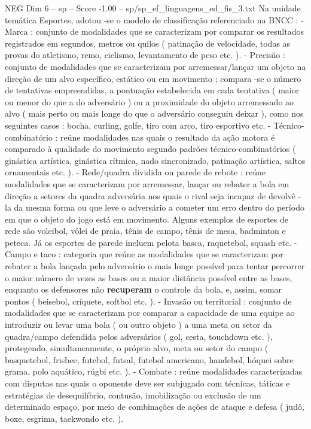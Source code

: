 \begin{textsample}{NEG Dim 6 – sp – Score -1.00 – sp/sp\_ef\_linguagens\_ed\_fis\_3.txt}  \label{ex:f6_neg_203}
Na unidade temática Esportes, adotou -se o modelo de classificação referenciado na BNCC : - Marca : conjunto de modalidades que se caracterizam por comparar os resultados registrados em segundos, metros ou quilos ( patinação de velocidade, todas as provas do atletismo, remo, ciclismo, levantamento de peso etc. ). - Precisão : conjunto de modalidades que se caracterizam por arremessar/lançar um objeto na direção de um alvo específico, estático ou em movimento ; compara -se o número de tentativas empreendidas, a pontuação estabelecida em cada tentativa ( maior ou menor do que a do adversário ) ou a proximidade do objeto arremessado ao alvo ( mais perto ou mais longe do que o adversário conseguiu deixar ), como nos seguintes casos : bocha, curling, golfe, tiro com arco, tiro esportivo etc. - Técnico-combinatório : reúne modalidades nas quais o resultado da ação motora é comparado à qualidade do movimento segundo padrões técnico-combinatórios ( ginástica artística, ginástica rítmica, nado sincronizado, patinação artística, saltos ornamentais etc. ). - Rede/quadra dividida ou parede de rebote : reúne modalidades que se caracterizam por arremessar, lançar ou rebater a bola em direção a setores da quadra adversária nos quais o rival seja incapaz de devolvê -la da mesma forma ou que leve o adversário a cometer um erro dentro do período em que o objeto do jogo está em movimento.
Alguns exemplos de esportes de rede são voleibol, vôlei de praia, tênis de campo, tênis de mesa, badminton e peteca.
Já os esportes de parede incluem pelota basca, raquetebol, squash etc. - Campo e taco : categoria que reúne as modalidades que se caracterizam por rebater a bola lançada pelo adversário o mais longe possível para tentar percorrer o maior número de vezes as bases ou a maior distância possível entre as bases, enquanto os defensores não \textbf{recuperam} o controle da bola, e, assim, somar pontos ( beisebol, críquete, softbol etc. ). - Invasão ou territorial : conjunto de modalidades que se caracterizam por comparar a capacidade de uma equipe ao introduzir ou levar uma bola ( ou outro objeto ) a uma meta ou setor da quadra/campo defendida pelos adversários ( gol, cesta, touchdown etc. ), protegendo, simultaneamente, o próprio alvo, meta ou setor do campo ( basquetebol, frisbee, futebol, futsal, futebol americano, handebol, hóquei sobre grama, polo aquático, rúgbi etc. ). - Combate : reúne modalidades caracterizadas com disputas nas quais o oponente deve ser subjugado com técnicas, táticas e estratégias de desequilíbrio, contusão, imobilização ou exclusão de um determinado espaço, por meio de combinações de ações de ataque e defesa ( judô, boxe, esgrima, taekwondo etc. ).

\end{textsample}
